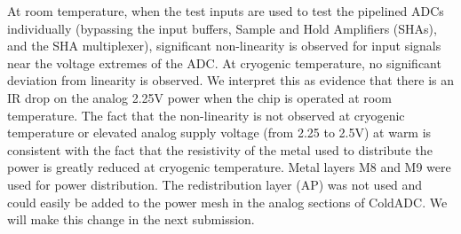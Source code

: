 \label{sec:5.6}

%
%

At room temperature, when the test inputs are used to test the pipelined ADCs individually (bypassing the input buffers, Sample and Hold Amplifiers (SHAs), and the SHA multiplexer), significant non-linearity is observed for input signals near the voltage extremes of the ADC.  At cryogenic temperature, no significant deviation from linearity is observed.  We interpret this as evidence that there is an IR drop on the analog 2.25V power when the chip is operated at room temperature.  The fact that the non-linearity is not observed at cryogenic temperature or elevated analog supply voltage (from 2.25 to 2.5V) at warm is consistent with the fact that the resistivity of the metal used to distribute the power is greatly reduced at cryogenic temperature. 
Metal layers M8 and M9 were used for power distribution.  The redistribution layer (AP) was not used and could easily be added to the power mesh in the analog sections of ColdADC.  We will make this change in the next submission.
